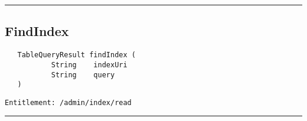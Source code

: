 \rule{12cm}{2pt}
\subsection{FindIndex}
\label{Api:FindIndex}
\begin{Verbatim}
   TableQueryResult findIndex (
           String    indexUri
           String    query
   )
\end{Verbatim}
\begin{Verbatim}[formatcom=\color{Maroon}]
  Entitlement: /admin/index/read
\end{Verbatim}



\rule{12cm}{2pt}

